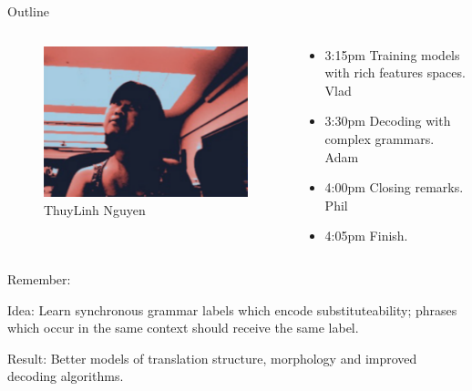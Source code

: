\documentclass{beamer}
\newenvironment{unpacked_itemize}{
\begin{itemize}
  \setlength{\itemsep}{10pt}
  \setlength{\parskip}{0pt}
  \setlength{\parsep}{0pt}
}{\end{itemize}}
\begin{document}
\begin{frame}[t]{Outline}
\begin{columns}
\begin{column}{0.2\textwidth}
\begin{exampleblock}{}
\begin{figure}
        {\centering \includegraphics[scale=0.15]{linh.pdf}} \\
        ThuyLinh Nguyen\\

      \end{figure}
    \end{exampleblock}
  \vspace{0.25in}
  \end{column}
  \begin{column}{0.7\textwidth}
    \begin{itemize}
    \setlength{\itemsep}{25pt}
    \setlength{\parskip}{0pt}
    \setlength{\parsep}{0pt}
    \item 3:15pm Training models with rich features spaces. Vlad
    \item 3:30pm Decoding with complex grammars. Adam
    \item 4:00pm Closing remarks. Phil
    \item 4:05pm Finish.
    \end{itemize}
  \end{column}
\end{columns}
\end{frame}



\begin{frame}[t]{Remember:}
  \vspace{0.5in}
  \begin{unpacked_itemize}
    \item Idea: Learn synchronous grammar labels which encode substituteability; phrases which occur in the same context should receive the same label.
    \item Result: Better models of translation structure, morphology and improved decoding algorithms.
  \end{unpacked_itemize}
\end{frame}
\end{document}
